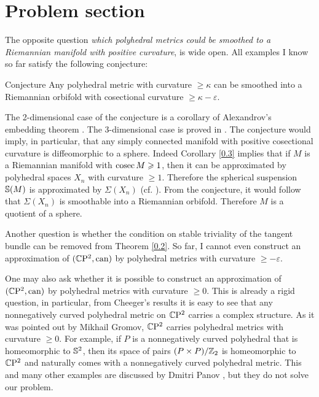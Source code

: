 \documentclass{article}
\begin{document}
\section{Problem section}\label{sec:Problem section}

The opposite question
\textit{which polyhedral metrics could be smoothed to a Riemannian manifold with positive curvature},
is wide open.
All examples I know so far satisfy the following conjecture:

\begin{thm}{Conjecture} Any polyhedral metric with curvature $\ge \kappa$
can be smoothed into a Riemannian orbifold with cosectional
curvature $\ge \kappa-\varepsilon$.
\end{thm}

The 2-dimensional case of the conjecture is a 
corollary of Alexandrov's embedding theorem \cite{Al}.
The 3-dimensional case is proved in \cite{LMPS}.
The conjecture would imply, in particular,
that any simply connected
manifold with positive cosectional curvature is diffeomorphic
to a sphere.
Indeed Corollary \ref{0.3}
implies that if $M$
is a Riemannian manifold with $\mathop{\rm cosec}\nolimits M\geqslant 1$, then it can be approximated by polyhedral spaces $X_n$
with curvature $\ge 1$.
Therefore the spherical suspension $\mathbb{S}(M)$ is approximated by $\Sigma (X_n)$ (cf. \cite{GW}).
From the conjecture, it would follow that $\Sigma(X_n)$ is smoothable into a Riemannian orbifold.
Therefore $M$ is a quotient of a sphere.

\medskip

Another question is whether the condition on stable triviality of the tangent bundle can be removed from Theorem \ref{0.2}.
 So far, I cannot even construct an approximation of
$(\mathbb{C}\mathrm{P}^2,\text{can})$ by polyhedral metrics with curvature
$\ge -\varepsilon$.

One may also ask whether it is possible to construct an approximation
of $(\mathbb{C}\mathrm{P}^2,\text{can})$ by polyhedral metrics with curvature
$\ge 0$. This is already a rigid question, in particular, from
Cheeger's results \cite{Ch} it is easy to see that any nonnegatively
curved polyhedral metric on $\mathbb{C}\mathrm{P}^2$ carries a complex structure.
As it was pointed out by Mikhail Gromov,
$\mathbb{C}\mathrm{P}^2$ carries polyhedral
metrics with curvature $\ge 0$. 
For example, if $P$ is a nonnegatively curved polyhedral that is homeomorphic to $\mathbb{S}^2$, then its space of pairs $(P\times P)/\mathbb{Z}_2$ is homeomorphic to $\mathbb{C}\mathrm{P}^2$ and naturally comes with a nonnegatively curved polyhedral metric.
This and many other examples are discussed by Dmitri Panov \cite{Pan}, but they do not solve our problem. 
\end{document}
